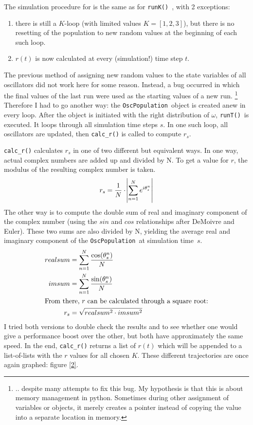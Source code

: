 \documentclass[11pt,a4paper]{article}
\newcommand{\oscpop}{\texttt{OscPopulation}~}
\newcommand{\runK}{\code{runK()}~}
\newcommand{\runT}{\code{runT()}~}
\newcommand{\code}[1]{\texttt{#1}}
\begin{document}
The simulation procedure for is the same as for \runK, with 2 exceptions:
\begin{enumerate}
	\item there is still a $K$-loop (with limited values $K = [1,2,3]$), but there is no resetting of the population to new random values at the beginning of each such loop.
	\item $r(t)$ is now calculated at every (simulation!) time step $t$.
\end{enumerate}
The previous method of assigning new random values to the state variables of all oscillators did not work here for some reason. 
Instead, a bug occurred in which the final values of the last run were used as the starting values of a new run.%
	\footnote{.. despite many attempts to fix this bug. My hypothesis is that this is about memory management in python. Sometimes during other assignment of variables or objects, it merely creates a pointer instead of copying the value into a separate location in memory.}
Therefore I had to go another way: the \oscpop object is created anew in every loop. 
After the object is initiated with the right distribution of $\omega$, \runT is executed. 
It loops through all simulation time steps $s$. 
In one such loop, all oscillators are updated, then \code{calc\_r()} is called to compute $r_s$.

\code{calc\_r()} calculates $r_s$ in one of two different but equivalent ways. 
In one way, actual complex numbers are added up and divided by N. 
To get a value for $r$, the modulus of the resulting complex number is taken. 
$$ r_s = \frac{1}{N}       \cdot       \abs{\sum_{n=1}^N e^{ i \theta^n_s}}$$
The other way is to compute the double sum of real and imaginary component of the complex number (using the $sin$ and $cos$ relationships after DeMoivre and Euler).
These two sums are also divided by N, yielding the average real and imaginary component of the \oscpop at simulation time~$s$. 
\begin{align*}
	realsum 	&= \sum_{n=1}^N \frac{\cos(\theta^n_s)}{N} \\
	imsum 		&= \sum_{n=1}^N \frac{\sin(\theta^n_s)}{N} \\
\intertext{From there, $r$ can be calculated through a square root:}
	r_s			&= \sqrt{realsum^2 \cdot imsum^2}
\end{align*}
I tried both versions to double check the results and to see whether one would give a performance boost over the other, but both have approximately the same speed.
In the end, \code{calc\_r()} returns a list of $r(t)$ which will be appended to a list-of-lists with the $r$ values for all chosen $K$. 
These different trajectories are once again graphed: figure \ref{2}.
\end{document}
